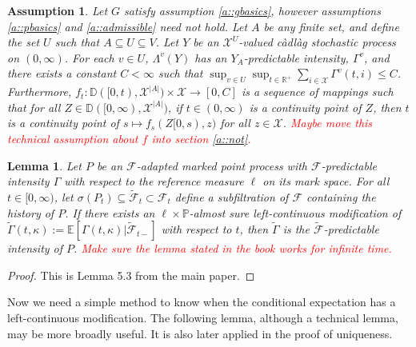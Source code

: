 \documentclass[12pt]{article}
\newcommand{\mb}{\mathbb}
\newcommand{\mc}{\mathcal}
\newcommand{\ra}{\rightarrow}
\newcommand{\tr}{\textcolor{red}}
\newcommand{\pr}{\mb{P}}							%
\newcommand{\ex}[1]{\mb{E}\left[#1\right]}			%
\newcommand{\cad}{\mb{D}}							%
\newcommand{\sta}{\mc{X}}							%
\newcommand{\Sm}{\ell}								%
\newcommand{\F}{\mc{F}}								%
\newcommand{\vind}[1]{_{#1}}						%
\newcommand{\tmi}[1]{#1}							%
\newcommand{\vpara}[1]{^{#1}}						%
\newcommand{\tpara}[1]{_{#1}}						%
\newcommand{\Xg}{Y}									%
\newcommand{\alt}[1]{\tilde{#1}}					%
\newcommand{\pmap}{\Lambda}							%
\renewcommand{\mark}{\kappa}						%
\newcommand{\ratee}{\Gamma}							%
\newcommand{\cratee}{\alt{\ratee}}					%
\newcommand{\rp}{P}									%
\newcommand{\Xh}{Z}									%
\newtheorem{lem}[thms]{Lemma}
\newtheorem{assu}[thms]{Assumption}
\begin{document}
\begin{assu}
Let \(G\) satisfy assumption \ref{a::gbasics}, however assumptions \ref{a::pbasics} and \ref{a::admissible} need not hold. Let \(A\) be any finite set, and define the set \(U\) such that \(A\subseteq U \subseteq V\). Let \(\Xg\) be an \(\sta^U\)-valued c\`adl\`ag stochastic process on \((0,\infty)\). For each \(v\in U\), \(\pmap\vpara{v}(\Xg)\) has an \(\Xg\vind{A}\)-predictable intensity, \(\ratee\vpara{v}\), and there exists a constant \(C < \infty\) such that \(\sup_{v\in U}\sup_{t\in \mb{R}^+}\sum_{i \in \sta} \ratee\vpara{v}(t,i) \leq C\). Furthermore, \(f\tpara{t}: \cad([0,t),\sta^{|A|})\times \sta\ra[0,C]\) is a sequence of mappings such that for all \(\Xh \in \cad([0,\infty),\sta^{|A|})\), if \(t\in (0,\infty)\) is a continuity point of \(\Xh\), then \(t\) is a continuity point of \(s \mapsto f\tpara{s}(\Xh\tmi{[0,s)},z)\) for all \(z \in \sta\). \tr{Maybe move this technical assumption about \(f\) into section \ref{a::not}.}
\label{Ex::Eassu}
\end{assu}


\begin{lem}
Let \(\rp\) be an \(\F\)-adapted marked point process with \(\F\)-predictable intensity \(\ratee\) with respect to the reference measure \(\Sm\) on its mark space. For all \(t \in [0,\infty)\), let \(\sigma(\rp_{t}) \subseteq \alt{\F}_{t}\subset \F_{t}\) define a subfiltration of \(\F\) containing the history of \(\rp\). If there exists an \(\ell\times \pr\)-almost sure left-continuous modification of \(\cratee(t,\mark) := \ex{\ratee(t,\mark)|\alt{\F}_{t-}}\) with respect to \(t\), then \(\cratee\) is the \(\alt{\F}\)-predictable intensity of \(\rp\). \tr{Make sure the lemma stated in the book works for infinite time.}
\label{Ex::filtering}
\end{lem}

\begin{proof}
This is Lemma 5.3 from the main paper.
\end{proof}

Now we need a simple method to know when the conditional expectation has a left-continuous modification. The following lemma, although a technical lemma, may be more broadly useful. It is also later applied in the proof of uniqueness.
\end{document}
